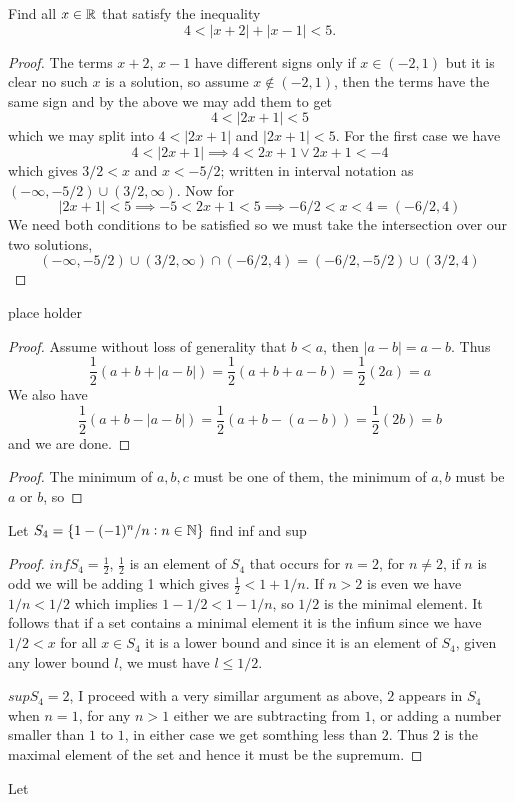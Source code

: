 \question 
Find all $x \in \mathbb{R}$ that satisfy the inequality 
\[ 4 < |x + 2| + |x - 1| < 5. \] 


\begin{proof}
    The terms $x + 2$, $x - 1$ have different signs only if $x \in (-2, 1)$ but it is clear 
    no such $x$ is a solution, so assume $x \notin (-2, 1)$, then the terms have the same sign and by the above we may add them 
    to get 
    \[4 < |2x +1 | < 5\]
    which we may split into $4 < |2x + 1| $ and $|2x + 1| < 5$. 
    For the first case we have 
    \[4 < |2x + 1| \implies 4 < 2x + 1 \vee 2x + 1 < -4\]
    which gives $3/2 < x$ and $x < -5/2$; written in interval notation as $(-\infty, -5/2) \cup (3/2, \infty)$. 
    Now for 
    \[|2x + 1| < 5 \implies -5 < 2x + 1 < 5 \implies -6/2 < x < 4 = (-6/2, 4)\]
    We need both conditions to be satisfied so we must take the intersection over our two solutions, 
    \[(-\infty, -5/2) \cup (3/2, \infty) \cap (-6/2, 4) = (-6/2, -5/2) \cup (3/2, 4)\]
\end{proof}

\question 
place holder 


\begin{alphaparts}
\questionpart

\begin{proof}
    Assume without loss of generality that $b < a$, then $|a - b| = a - b$. 
    Thus 
    \[\frac{1}{2}(a + b + |a - b|) = \frac{1}{2}(a + b + a -b ) = \frac{1}{2}(2a) = a\]
    We also have 
    \[\frac{1}{2}(a + b - |a - b|) = \frac{1}{2}(a + b -(a - b)) = \frac{1}{2}(2b) = b\]
    and we are done.  
\end{proof}

\questionpart 


\begin{proof}
    The minimum of $a, b, c$ must be one of them, the minimum of $a, b$ must be $a$ or $b$, so 

\end{proof}


\end{alphaparts}


\question 
Let $S_4 = \{1 - (-1)^n/n: n \in \mathbb{N}\}$ find inf and sup


\begin{proof}
$inf S_4 = \frac{1}{2}$, $\frac{1}{2}$ is an element of $S_4$ that occurs for $n = 2$, for $n \neq 2$, if $n$ is odd we will be adding 1 which 
gives $\frac{1}{2} < 1 + 1/n$. If $n>2$ is even we have $1/n < 1/2$ which implies $1 - 1/2 < 1 - 1/n$, so $1/2$ is the minimal element. It follows that 
if a set contains a minimal element it is the infium since we have $1/2 < x$ for all $x \in S_4$ it is a lower bound and since it is an element of $S_4$, given any lower bound $l$, we must 
have $l \leq 1/2$. 

$sup S_4 = 2$, I proceed with a very simillar argument as above, $2$ appears in $S_4$ when $n=1$, for any $n>1$ either we are subtracting from $1$, or adding a number smaller than $1$ to $1$, in either case 
we get somthing less than $2$. Thus $2$ is the maximal element of the set and hence it must be the supremum. 
\end{proof}


\question 
Let 
    
